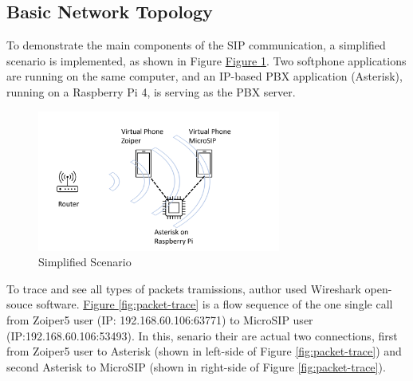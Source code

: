 \subsection{Basic Network Topology}
To demonstrate the main components of the SIP communication, a simplified scenario is implemented, as shown in Figure  \hyperref[fig:topo]{Figure \ref{fig:topo}}. Two softphone applications are running on the same computer, and an IP-based PBX application (Asterisk), running on a Raspberry Pi 4, is serving as the PBX server.

\begin{figure}[htbp]
	\centerline{\includegraphics[width=8cm]{Images/experiment/exp1.png}}
	\caption{Simplified Scenario}
	\label{fig:topo}
\end{figure}

To trace and see all types of packets tramissions, author used Wireshark open-souce software. \hyperref[fig:packet-trace]{Figure \ref{fig:packet-trace}} is a flow sequence of the one single call from Zoiper5 user (IP: 192.168.60.106:63771) to MicroSIP user (IP:192.168.60.106:53493). In this, senario their are actual two connections, first from Zoiper5 user to Asterisk (shown in left-side of Figure \ref{fig:packet-trace}) and second Asterisk to MicroSIP (shown in right-side of Figure \ref{fig:packet-trace}).

